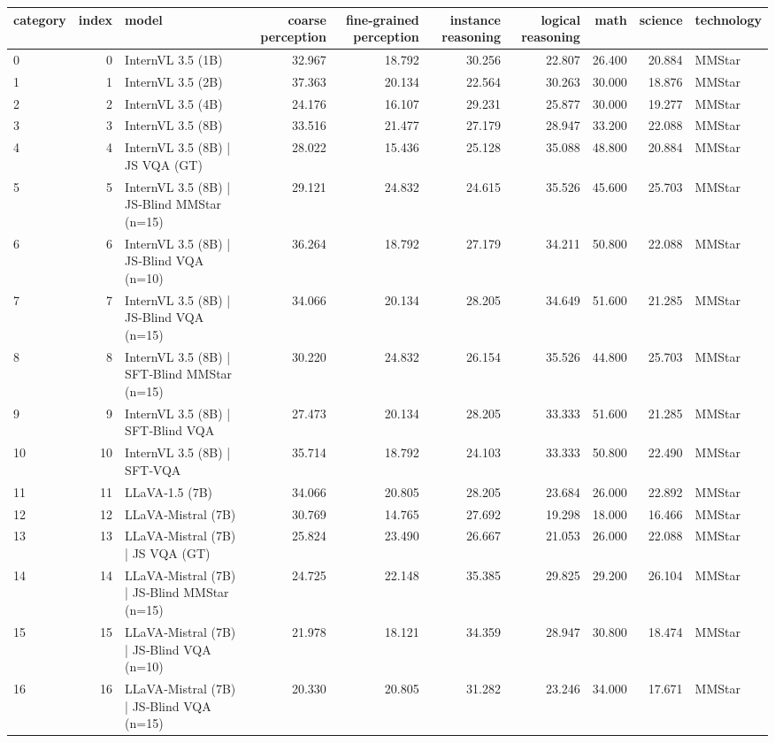 \begin{tabular}{lrlrrrrrrl}
\toprule
category & index & model & coarse perception & fine-grained perception & instance reasoning & logical reasoning & math & science & technology &  \\
\midrule
0 & 0 & InternVL 3.5 (1B) & 32.967 & 18.792 & 30.256 & 22.807 & 26.400 & 20.884 & MMStar \\
1 & 1 & InternVL 3.5 (2B) & 37.363 & 20.134 & 22.564 & 30.263 & 30.000 & 18.876 & MMStar \\
2 & 2 & InternVL 3.5 (4B) & 24.176 & 16.107 & 29.231 & 25.877 & 30.000 & 19.277 & MMStar \\
3 & 3 & InternVL 3.5 (8B) & 33.516 & 21.477 & 27.179 & 28.947 & 33.200 & 22.088 & MMStar \\
4 & 4 & InternVL 3.5 (8B) | JS VQA (GT) & 28.022 & 15.436 & 25.128 & 35.088 & 48.800 & 20.884 & MMStar \\
5 & 5 & InternVL 3.5 (8B) | JS‑Blind MMStar (n=15) & 29.121 & 24.832 & 24.615 & 35.526 & 45.600 & 25.703 & MMStar \\
6 & 6 & InternVL 3.5 (8B) | JS‑Blind VQA (n=10) & 36.264 & 18.792 & 27.179 & 34.211 & 50.800 & 22.088 & MMStar \\
7 & 7 & InternVL 3.5 (8B) | JS‑Blind VQA (n=15) & 34.066 & 20.134 & 28.205 & 34.649 & 51.600 & 21.285 & MMStar \\
8 & 8 & InternVL 3.5 (8B) | SFT‑Blind MMStar (n=15) & 30.220 & 24.832 & 26.154 & 35.526 & 44.800 & 25.703 & MMStar \\
9 & 9 & InternVL 3.5 (8B) | SFT‑Blind VQA & 27.473 & 20.134 & 28.205 & 33.333 & 51.600 & 21.285 & MMStar \\
10 & 10 & InternVL 3.5 (8B) | SFT‑VQA & 35.714 & 18.792 & 24.103 & 33.333 & 50.800 & 22.490 & MMStar \\
11 & 11 & LLaVA‑1.5 (7B) & 34.066 & 20.805 & 28.205 & 23.684 & 26.000 & 22.892 & MMStar \\
12 & 12 & LLaVA‑Mistral (7B) & 30.769 & 14.765 & 27.692 & 19.298 & 18.000 & 16.466 & MMStar \\
13 & 13 & LLaVA‑Mistral (7B) | JS VQA (GT) & 25.824 & 23.490 & 26.667 & 21.053 & 26.000 & 22.088 & MMStar \\
14 & 14 & LLaVA‑Mistral (7B) | JS‑Blind MMStar (n=15) & 24.725 & 22.148 & 35.385 & 29.825 & 29.200 & 26.104 & MMStar \\
15 & 15 & LLaVA‑Mistral (7B) | JS‑Blind VQA (n=10) & 21.978 & 18.121 & 34.359 & 28.947 & 30.800 & 18.474 & MMStar \\
16 & 16 & LLaVA‑Mistral (7B) | JS‑Blind VQA (n=15) & 20.330 & 20.805 & 31.282 & 23.246 & 34.000 & 17.671 & MMStar \\

\end{tabular}
